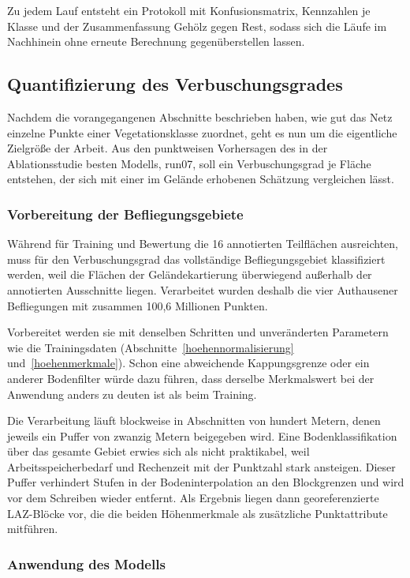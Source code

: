 Zu jedem Lauf entsteht ein Protokoll mit Konfusionsmatrix, Kennzahlen je Klasse
und der Zusammenfassung Gehölz gegen Rest, sodass sich die Läufe im Nachhinein
ohne erneute Berechnung gegenüberstellen lassen.

\subsection{Quantifizierung des Verbuschungsgrades}\label{quantifizierung}

Nachdem die vorangegangenen Abschnitte beschrieben haben, wie gut das Netz einzelne Punkte einer Vegetationsklasse zuordnet, geht es nun um die eigentliche Zielgröße der Arbeit. Aus den punktweisen Vorhersagen des in der Ablationsstudie besten Modells, run07, soll ein Verbuschungsgrad je Fläche entstehen, der sich mit einer im Gelände erhobenen Schätzung vergleichen lässt.

\subsubsection{Vorbereitung der Befliegungsgebiete}\label{inferenz_preprocessing}

Während für Training und Bewertung die 16 annotierten Teilflächen ausreichten, muss für den Verbuschungsgrad das vollständige Befliegungsgebiet klassifiziert werden, weil die Flächen der Geländekartierung überwiegend außerhalb der annotierten Ausschnitte liegen. Verarbeitet wurden deshalb die vier Authausener Befliegungen mit zusammen 100,6 Millionen Punkten.

Vorbereitet werden sie mit denselben Schritten und unveränderten Parametern wie die Trainingsdaten (Abschnitte~\ref{hoehennormalisierung} und~\ref{hoehenmerkmale}). Schon eine abweichende Kappungsgrenze oder ein anderer Bodenfilter würde dazu führen, dass derselbe Merkmalswert bei der Anwendung anders zu deuten ist als beim Training.

Die Verarbeitung läuft blockweise in Abschnitten von hundert Metern, denen jeweils ein Puffer von zwanzig Metern beigegeben wird. Eine Bodenklassifikation über das gesamte Gebiet erwies sich als nicht praktikabel, weil Arbeitsspeicherbedarf und Rechenzeit mit der Punktzahl stark ansteigen. Dieser Puffer verhindert Stufen in der Bodeninterpolation an den Blockgrenzen und wird vor dem Schreiben wieder entfernt. Als Ergebnis liegen dann georeferenzierte LAZ-Blöcke vor, die die beiden Höhenmerkmale als zusätzliche Punktattribute mitführen.

\subsubsection{Anwendung des Modells}\label{inferenz}

